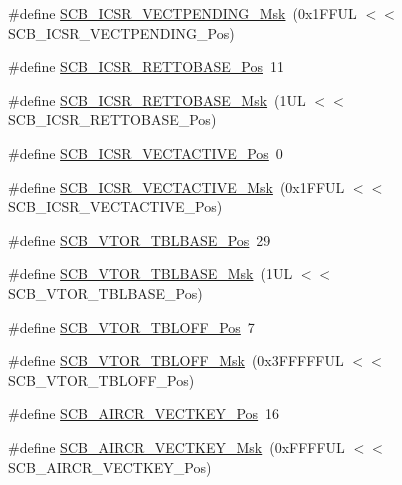 \begin{DoxyCompactItemize}
\item 
\#define \mbox{\hyperlink{group___c_m_s_i_s___s_c_b_gacb6992e7c7ddc27a370f62878a21ef72}{S\+C\+B\+\_\+\+I\+C\+S\+R\+\_\+\+V\+E\+C\+T\+P\+E\+N\+D\+I\+N\+G\+\_\+\+Msk}}~(0x1\+F\+F\+U\+L $<$$<$ S\+C\+B\+\_\+\+I\+C\+S\+R\+\_\+\+V\+E\+C\+T\+P\+E\+N\+D\+I\+N\+G\+\_\+\+Pos)
\item 
\#define \mbox{\hyperlink{group___c_m_s_i_s___s_c_b_ga403d154200242629e6d2764bfc12a7ec}{S\+C\+B\+\_\+\+I\+C\+S\+R\+\_\+\+R\+E\+T\+T\+O\+B\+A\+S\+E\+\_\+\+Pos}}~11
\item 
\#define \mbox{\hyperlink{group___c_m_s_i_s___s_c_b_gaca6fc3f79bb550f64fd7df782ed4a5f6}{S\+C\+B\+\_\+\+I\+C\+S\+R\+\_\+\+R\+E\+T\+T\+O\+B\+A\+S\+E\+\_\+\+Msk}}~(1\+U\+L $<$$<$ S\+C\+B\+\_\+\+I\+C\+S\+R\+\_\+\+R\+E\+T\+T\+O\+B\+A\+S\+E\+\_\+\+Pos)
\item 
\#define \mbox{\hyperlink{group___c_m_s_i_s___s_c_b_gae4f602c7c5c895d5fb687b71b0979fc3}{S\+C\+B\+\_\+\+I\+C\+S\+R\+\_\+\+V\+E\+C\+T\+A\+C\+T\+I\+V\+E\+\_\+\+Pos}}~0
\item 
\#define \mbox{\hyperlink{group___c_m_s_i_s___s_c_b_ga5533791a4ecf1b9301c883047b3e8396}{S\+C\+B\+\_\+\+I\+C\+S\+R\+\_\+\+V\+E\+C\+T\+A\+C\+T\+I\+V\+E\+\_\+\+Msk}}~(0x1\+F\+F\+U\+L $<$$<$ S\+C\+B\+\_\+\+I\+C\+S\+R\+\_\+\+V\+E\+C\+T\+A\+C\+T\+I\+V\+E\+\_\+\+Pos)
\item 
\#define \mbox{\hyperlink{group___c_m_s_i_s___s_c_b_gad9720a44320c053883d03b883b955751}{S\+C\+B\+\_\+\+V\+T\+O\+R\+\_\+\+T\+B\+L\+B\+A\+S\+E\+\_\+\+Pos}}~29
\item 
\#define \mbox{\hyperlink{group___c_m_s_i_s___s_c_b_ga778dd0ba178466b2a8877a6b8aa345ee}{S\+C\+B\+\_\+\+V\+T\+O\+R\+\_\+\+T\+B\+L\+B\+A\+S\+E\+\_\+\+Msk}}~(1\+U\+L $<$$<$ S\+C\+B\+\_\+\+V\+T\+O\+R\+\_\+\+T\+B\+L\+B\+A\+S\+E\+\_\+\+Pos)
\item 
\#define \mbox{\hyperlink{group___c_m_s_i_s___s_c_b_gac6a55451ddd38bffcff5a211d29cea78}{S\+C\+B\+\_\+\+V\+T\+O\+R\+\_\+\+T\+B\+L\+O\+F\+F\+\_\+\+Pos}}~7
\item 
\#define \mbox{\hyperlink{group___c_m_s_i_s___s_c_b_ga75e395ed74042923e8c93edf50f0996c}{S\+C\+B\+\_\+\+V\+T\+O\+R\+\_\+\+T\+B\+L\+O\+F\+F\+\_\+\+Msk}}~(0x3\+F\+F\+F\+F\+F\+U\+L $<$$<$ S\+C\+B\+\_\+\+V\+T\+O\+R\+\_\+\+T\+B\+L\+O\+F\+F\+\_\+\+Pos)
\item 
\#define \mbox{\hyperlink{group___c_m_s_i_s___s_c_b_gaaa27c0ba600bf82c3da08c748845b640}{S\+C\+B\+\_\+\+A\+I\+R\+C\+R\+\_\+\+V\+E\+C\+T\+K\+E\+Y\+\_\+\+Pos}}~16
\item 
\#define \mbox{\hyperlink{group___c_m_s_i_s___s_c_b_ga90c7cf0c490e7ae55f9503a7fda1dd22}{S\+C\+B\+\_\+\+A\+I\+R\+C\+R\+\_\+\+V\+E\+C\+T\+K\+E\+Y\+\_\+\+Msk}}~(0x\+F\+F\+F\+F\+U\+L $<$$<$ S\+C\+B\+\_\+\+A\+I\+R\+C\+R\+\_\+\+V\+E\+C\+T\+K\+E\+Y\+\_\+\+Pos)

\end{DoxyCompactItemize}
